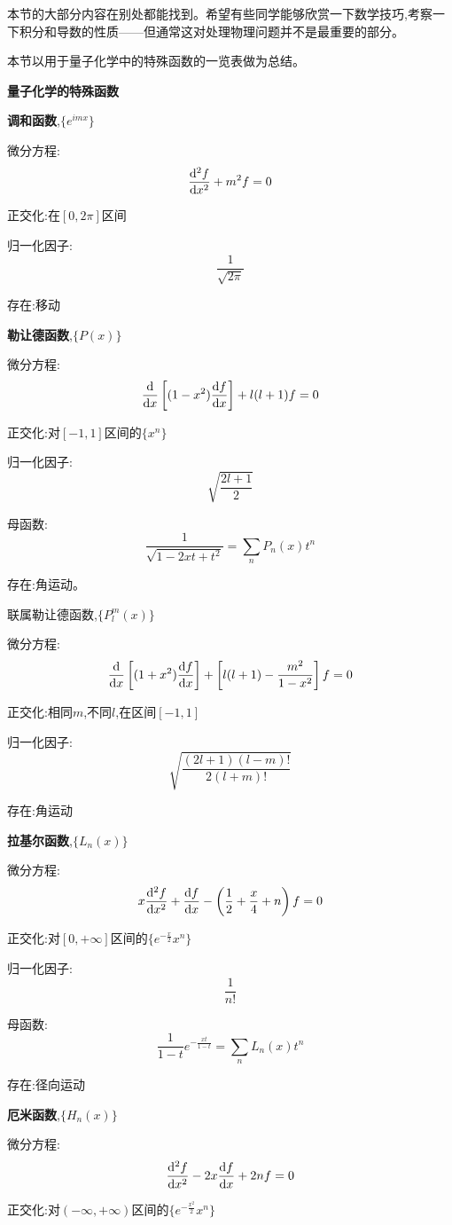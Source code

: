 本节的大部分内容在别处都能找到。希望有些同学能够欣赏一下数学技巧,考察一下积分和导数的性质——但通常这对处理物理问题并不是最重要的部分。

本节以用于量子化学中的特殊函数的一览表做为总结。
\vspace{0.5cm}
\begin{center}
    \textbf{\Large{量子化学的特殊函数}}
\end{center}


\textbf{调和函数},$\{e^{imx}\}$

微分方程:
\[\dv[2]{f}{x}+m^2f=0\]

正交化:在$[0,2π]$区间

归一化因子:
\[\frac{1}{\sqrt{2\pi}}\]

存在:移动

\textbf{勒让德函数},$\{P(x)\}$

微分方程:
\[\dv{x}\left[(1-x^2)\dv{f}{x}\right]+l(l+1)f=0\]

正交化:对$[-1,1]$区间的$\{x^n\}$

归一化因子:
\[\sqrt{\frac{2l+1}{2}}\]

母函数:
\[\frac{1}{\sqrt{1-2xt+t^2}}=\sum_nP_n(x)t^n\]

存在:角运动。

联属勒让德函数,$\{P_l^m(x)\}$

微分方程:
\[\dv{x}\left[(1+x^2)\dv{f}{x}\right]+\left[l(l+1)-\frac{m^2}{1-x^2}\right]f=0\]

正交化:相同$m$,不同$l$,在区间$[-1,1]$

归一化因子:
\[\sqrt{\frac{(2l+1)(l-m)!}{2(l+m)!}}\]

存在:角运动

\textbf{拉基尔函数},$\{L_n(x)\}$

微分方程:
\[x\dv[2]{f}{x}+\dv{f}{x}-\left(\frac{1}{2}+\frac{x}{4}+n\right)f=0\]

正交化:对$[0,+\infty]$区间的$\{e^{-\frac{x}{2}}x^n\}$

归一化因子:
\[\frac{1}{n!}\]

母函数:
\[\frac{1}{1-t}e^{-\frac{xt}{1-t}}=\sum_nL_n(x)t^n\]

存在:径向运动

\textbf{厄米函数},$\{H_n(x)\}$

微分方程:
\[\dv[2]{f}{x}-2x\dv{f}{x}+2nf=0\]

正交化:对$(-\infty,+\infty)$区间的$\{e^{-\frac{x^2}{2}}x^n\}$

